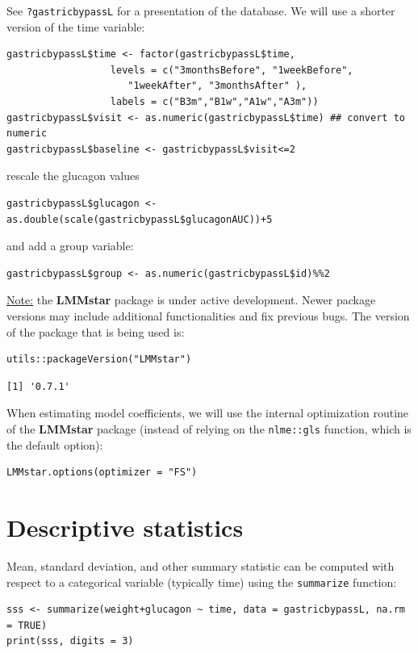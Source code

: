 \documentclass[12pt]{article}
\begin{document}
See \texttt{?gastricbypassL} for a presentation of the database. We will use a shorter version of the time variable:
\lstset{language=r,label= ,caption= ,captionpos=b,numbers=none}
\begin{lstlisting}
gastricbypassL$time <- factor(gastricbypassL$time,
			      levels = c("3monthsBefore", "1weekBefore",
					 "1weekAfter", "3monthsAfter" ),
			      labels = c("B3m","B1w","A1w","A3m"))
gastricbypassL$visit <- as.numeric(gastricbypassL$time) ## convert to numeric
gastricbypassL$baseline <- gastricbypassL$visit<=2
\end{lstlisting}
rescale the glucagon values
\lstset{language=r,label= ,caption= ,captionpos=b,numbers=none}
\begin{lstlisting}
gastricbypassL$glucagon <- as.double(scale(gastricbypassL$glucagonAUC))+5
\end{lstlisting}

and add a group variable:
\lstset{language=r,label= ,caption= ,captionpos=b,numbers=none}
\begin{lstlisting}
gastricbypassL$group <- as.numeric(gastricbypassL$id)%%2
\end{lstlisting}

\bigskip

\uline{Note:} the \textbf{LMMstar} package is under active development. Newer
package versions may include additional functionalities and fix
previous bugs. The version of the package that is being used is:
\lstset{language=r,label= ,caption= ,captionpos=b,numbers=none}
\begin{lstlisting}
utils::packageVersion("LMMstar")
\end{lstlisting}

\begin{verbatim}
[1] '0.7.1'
\end{verbatim}


When estimating model coefficients, we will use the internal
optimization routine of the \textbf{LMMstar} package (instead of relying on
the \texttt{nlme::gls} function, which is the default option):
\lstset{language=r,label= ,caption= ,captionpos=b,numbers=none}
\begin{lstlisting}
LMMstar.options(optimizer = "FS")
\end{lstlisting}

\clearpage

\section{Descriptive statistics}
\label{sec:org96053c3}
Mean, standard deviation, and other summary statistic can be computed
with respect to a categorical variable (typically time) using the
\texttt{summarize} function:
\lstset{language=r,label= ,caption= ,captionpos=b,numbers=none}
\begin{lstlisting}
sss <- summarize(weight+glucagon ~ time, data = gastricbypassL, na.rm = TRUE)
print(sss, digits = 3)
\end{lstlisting}
\end{document}

